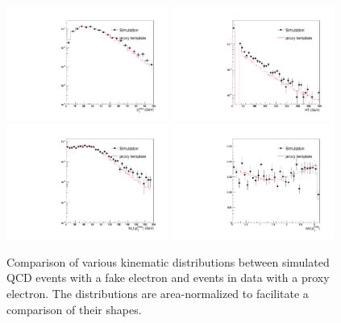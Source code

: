 \documentclass[thesis.tex]{subfiles}
\renewcommand\_{\textunderscore\allowbreak}
\begin{document}
\begin{figure}[hbtp]
    \begin{center}
    \includegraphics[width=0.475\textwidth]{Figures/faketemp_electron_met.pdf}
    \includegraphics[width=0.475\textwidth]{Figures/faketemp_electron_ht.pdf}
    \includegraphics[width=0.475\textwidth]{Figures/faketemp_electron_mt.pdf}
    \includegraphics[width=0.475\textwidth]{Figures/faketemp_electron_dPhi.pdf}
    \caption{Comparison of various kinematic distributions between simulated
        QCD events with a fake electron and events in data with a proxy
        electron. The distributions are area-normalized to facilitate a
        comparison of their shapes.}
        \label{fig:c_electron}
\end{center}\end{figure}
\end{document}
